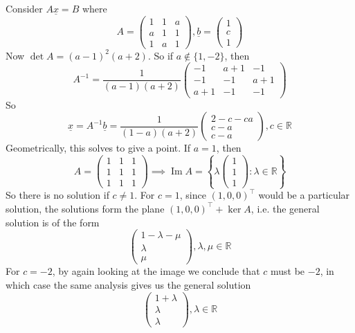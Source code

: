 \begin{example}
    Consider $A\underline{x}=B$ where
    $$A=\begin{pmatrix}
        1&1&a\\
        a&1&1\\
        1&a&1
    \end{pmatrix},\underline{b}=\begin{pmatrix}
        1\\
        c\\
        1
    \end{pmatrix}$$
    Now $\det A=(a-1)^2(a+2)$.
    So if $a\notin \{1,-2\}$, then
    $$
    A^{-1}=\frac{1}{(a-1)(a+2)}
    \begin{pmatrix}
        -1&a+1&-1\\
        -1&-1&a+1\\
        a+1&-1&-1
    \end{pmatrix}$$
    So
    $$\underline{x}=A^{-1}\underline{b}=\frac{1}{(1-a)(a+2)}\begin{pmatrix}
        2-c-ca\\
        c-a\\
        c-a
    \end{pmatrix},c\in\mathbb R$$
    Geometrically, this solves to give a point.
    If $a=1$, then
    $$A=\begin{pmatrix}
        1&1&1\\
        1&1&1\\
        1&1&1
    \end{pmatrix}\implies\operatorname{Im}A=\left\{\lambda\begin{pmatrix}
        1\\
        1\\
        1
    \end{pmatrix}:\lambda\in\mathbb R\right\}$$
    So there is no solution if $c\neq 1$.
    For $c=1$, since $(1,0,0)^\top$ would be a particular solution, the solutions form the plane $(1,0,0)^\top+\ker A$, i.e. the general solution is of the form
    $$\begin{pmatrix}
        1-\lambda-\mu\\
        \lambda\\
        \mu
    \end{pmatrix},\lambda,\mu\in\mathbb R$$
    For $c=-2$, by again looking at the image we conclude that $c$ must be $-2$, in which case the same analysis gives us the general solution
    $$\begin{pmatrix}
        1+\lambda\\
        \lambda\\
        \lambda
    \end{pmatrix},\lambda\in\mathbb R$$
\end{example}
